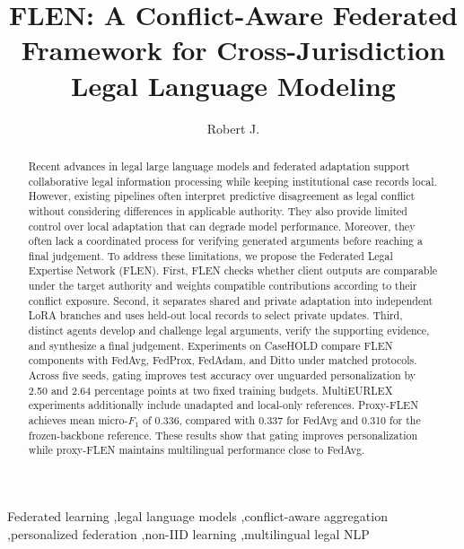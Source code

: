 \documentclass[a4paper,fleqn]{cas-sc}
\begin{document}
\let\WriteBookmarks\relax
\def\floatpagepagefraction{1}
\def\textpagefraction{.001}

\title[mode = title]{FLEN: A Conflict-Aware Federated Framework for Cross-Jurisdiction Legal Language Modeling}

\author[1]{Robert J.}

\begin{abstract}
Recent advances in legal large language models and federated adaptation support collaborative legal information processing while keeping institutional case records local. However, existing pipelines often interpret predictive disagreement as legal conflict without considering differences in applicable authority. They also provide limited control over local adaptation that can degrade model performance. Moreover, they often lack a coordinated process for verifying generated arguments before reaching a final judgement. To address these limitations, we propose the Federated Legal Expertise Network (FLEN). First, FLEN checks whether client outputs are comparable under the target authority and weights compatible contributions according to their conflict exposure. Second, it separates shared and private adaptation into independent LoRA branches and uses held-out local records to select private updates. Third, distinct agents develop and challenge legal arguments, verify the supporting evidence, and synthesize a final judgement. Experiments on CaseHOLD compare FLEN components with FedAvg, FedProx, FedAdam, and Ditto under matched protocols. Across five seeds, gating improves test accuracy over unguarded personalization by 2.50 and 2.64 percentage points at two fixed training budgets. MultiEURLEX experiments additionally include unadapted and local-only references. Proxy-FLEN achieves mean micro-$F_1$ of 0.336, compared with 0.337 for FedAvg and 0.310 for the frozen-backbone reference. These results show that gating improves personalization while proxy-FLEN maintains multilingual performance close to FedAvg.
\end{abstract}

\begin{keywords}
Federated learning \sep legal language models \sep conflict-aware aggregation \sep personalized federation \sep non-IID learning \sep multilingual legal NLP
\end{keywords}

\maketitle
\end{document}
